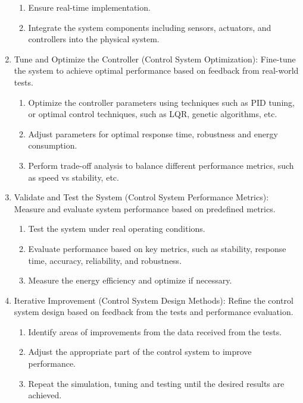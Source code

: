 \documentclass{article}
\begin{document}
\begin{enumerate}
\begin{enumerate}[label=\roman*.]
            \item Ensure real-time implementation.
            \item Integrate the system components including sensors, actuators, and controllers into the physical system.
        \end{enumerate}
    \item Tune and Optimize the Controller (Control System Optimization): Fine-tune the system to achieve optimal performance based on feedback from real-world tests.
        \begin{enumerate}[label=\roman*.]
            \item Optimize the controller parameters using techniques such as PID tuning, or optimal control techniques, such as LQR, genetic algorithms, etc.
            \item Adjust parameters for optimal response time, robustness and energy consumption.
            \item Perform trade-off analysis to balance different performance metrics, such as speed vs stability, etc.
        \end{enumerate}
    \item Validate and Test the System (Control System Performance Metrics): Measure and evaluate system performance based on predefined metrics.
        \begin{enumerate}[label=\roman*.]
            \item Test the system under real operating conditions.
            \item Evaluate performance based on key metrics, such as stability, response time, accuracy, reliability, and robustness.
            \item Measure the energy efficiency and optimize if necessary.
        \end{enumerate}
    \item Iterative Improvement (Control System Design Methods): Refine the control system design based on feedback from the tests and performance evaluation.
        \begin{enumerate}[label=\roman*.]
            \item Identify areas of improvements from the data received from the tests.
            \item Adjust the appropriate part of the control system to improve performance.
            \item Repeat the simulation, tuning and testing until the desired results are achieved.
        \end{enumerate}

\end{enumerate}
\end{document}
